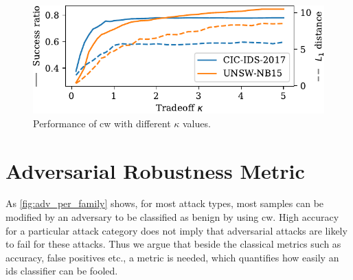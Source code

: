 \documentclass[conference]{IEEEtran}
\begin{document}

\begin{figure}[h]
\includegraphics[width=\columnwidth]{../plots/adv_comparison/tradeoff.pdf}
\caption{Performance of \gls{cw} with different $\kappa$ values.}
\label{fig:adv_cw}
\end{figure}

\section{Adversarial Robustness Metric}

As \autoref{fig:adv_per_family} shows, for most attack types, most samples can be modified by an adversary to be classified as benign by using \gls{cw}. High accuracy for a particular attack category does not imply that adversarial attacks are  likely to fail for these attacks. Thus we argue that beside the classical metrics such as accuracy, false positives etc., a metric is needed, which quantifies how easily an \gls{ids} classifier can be fooled.
\end{document}
